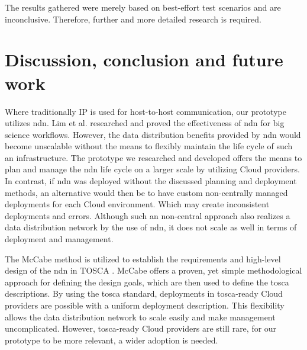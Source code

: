 \documentclass[conference]{IEEEtran}
\begin{document}
The results gathered were merely based on best-effort test scenarios and are inconclusive. Therefore, further and more detailed research is required.

\section{Discussion, conclusion and future work}
Where traditionally IP is used for host-to-host communication, our prototype utilizes \gls{ndn}. Lim et al. researched and proved the effectiveness of \gls{ndn} for big science workflows. However, the data distribution benefits provided by \gls{ndn} would become unscalable without the means to flexibly maintain the life cycle of such an infrastructure. The prototype we researched and developed offers the means to plan and manage the \gls{ndn} life cycle on a larger scale by utilizing Cloud providers. In contrast, if \gls{ndn} was deployed without the discussed planning and deployment methods, an alternative would then be to have custom non-centrally managed deployments for each Cloud environment. Which may create inconsistent deployments and errors. Although such an non-central approach also realizes a data distribution network by the use of \gls{ndn}, it does not scale as well in terms of deployment and management.

The McCabe method is utilized to establish the requirements and high-level design of the \gls{ndn} in TOSCA \cite{mccabe2010network}. McCabe offers a proven, yet simple methodological approach for defining the design goals, which are then used to define the \gls{tosca} descriptions. By using the \gls{tosca} standard, deployments in \gls{tosca}-ready Cloud providers are possible with a uniform deployment description. This flexibility allows the data distribution network to scale easily and make management uncomplicated. However, \gls{tosca}-ready Cloud providers are still rare, for our prototype to be more relevant, a wider adoption is needed.

\end{document}
